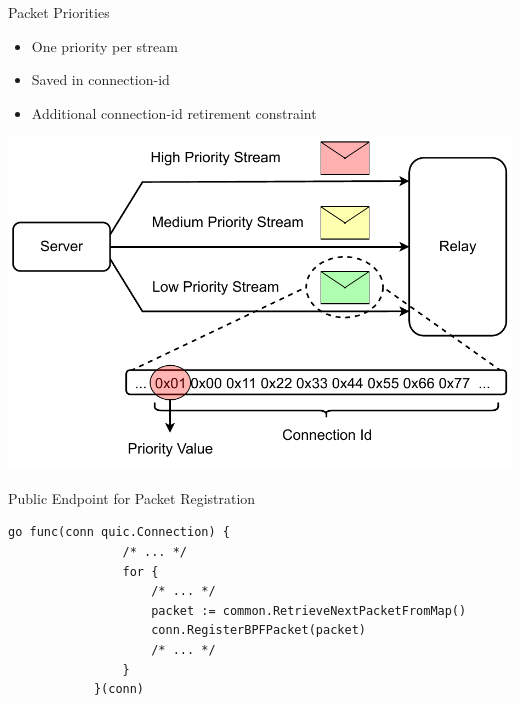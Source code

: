 \documentclass[shortpres,aspectratio=43]{beamer}
\newlength{\mylength}
\begin{document}
\begin{frame}{Packet Priorities}
    \begin{minipage}{0.43\textwidth}
        \begin{itemize}
            \item One priority per stream 
            \vspace{2\mylength}
            \item Saved in connection-id
            \vspace{2\mylength}
            \item Additional connection-id retirement constraint
        \end{itemize}
    \end{minipage}
    \begin{minipage}{0.55\textwidth}
        \includegraphics[scale=0.4]{../figures/03_fast_relays/priority-streams.drawio.pdf}
    \end{minipage}
\end{frame}

\begin{frame}[fragile]{Public Endpoint for Packet Registration}
    \begin{minipage}{\textwidth}
        \begin{lstlisting}[style=GoStyle,
            caption=Packet registration within relay code.]
            go func(conn quic.Connection) {
                /* ... */
                for {
                    /* ... */
                    packet := common.RetrieveNextPacketFromMap()
                    conn.RegisterBPFPacket(packet)
                    /* ... */
                }
            }(conn)
        \end{lstlisting}
    \end{minipage}
\end{frame}
\end{document}
